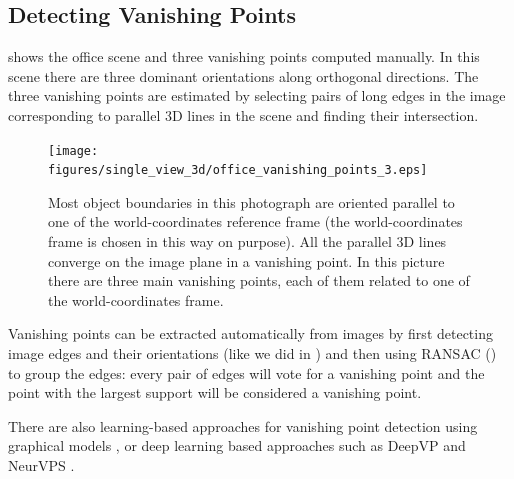 \subsection{Detecting Vanishing Points}

\Fig{\ref{fig:vanishing_lines}} shows the office scene and three vanishing points computed manually. In this scene there are three dominant orientations along orthogonal directions. The three vanishing points are estimated by selecting pairs of long edges in the image corresponding to parallel 3D lines in the scene and finding their intersection. 

\begin{figure}
\centerline{
\texttt{[image: figures/single\_view\_3d/office\_vanishing\_points\_3.eps]}
} 
\caption{Most object boundaries in this photograph are oriented parallel to one of the world-coordinates reference frame (the world-coordinates frame is chosen in this way on purpose). All the parallel 3D lines converge on the image plane in a vanishing point. In this picture there are three main vanishing points, each of them related to one of the world-coordinates frame.}
\label{fig:vanishing_lines}
\end{figure}

Vanishing points can be extracted automatically from images by first detecting image edges and their orientations (like we did in \chap{\ref{chapter:simplesystem}}) and then using RANSAC (\sect{\ref{sec:RANSAC}}) to group the edges: every pair of edges will vote for a vanishing point and the point with the largest support will be considered a vanishing point. 

There are also learning-based approaches for vanishing point detection using graphical models \cite{coughlan1999manhattan}, or deep learning based approaches such as DeepVP \cite{Chang2018DeepVPDL} and NeurVPS \cite{zhou2019neurvps}.


